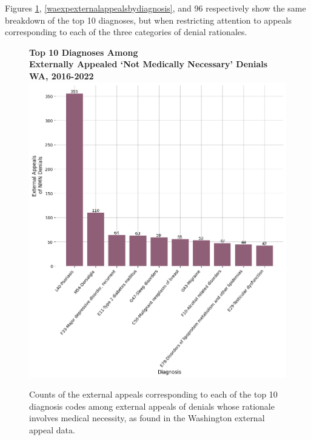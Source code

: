 \documentclass[12pt, a4paper,twoside,parskip=full]{report}
\theoremstyle{plain} %
\theoremstyle{definition} %
\theoremstyle{remark} %
\numberwithin{equation}{chapter}
\begin{document}
		Figures \ref{wanmnexternalappealsbydiagnosis}, \ref{waexpexternalappealsbydiagnosis}, and 96 respectively show the same breakdown of the top 10 diagnoses, but when restricting attention to appeals corresponding to each of the three categories of denial rationales.
		
		
		\begin{figure}[h!]
			\centering
			\textbf{Top 10 Diagnoses Among}\\ 
			\textbf{Externally Appealed `Not Medically Necessary' Denials}\\ 
			\textbf{WA, 2016-2022}\\
			\includegraphics[width=.8\textwidth]{images/wa_external_appeals/top_nmn_appeal_diagnoses.png}
			\caption{Counts of the external appeals corresponding to each of the top 10 diagnosis codes among external appeals of denials whose rationale involves medical necessity, as found in the Washington external appeal data.}
			\label{wanmnexternalappealsbydiagnosis}
		\end{figure}
	\clearpage
	
\end{document}
